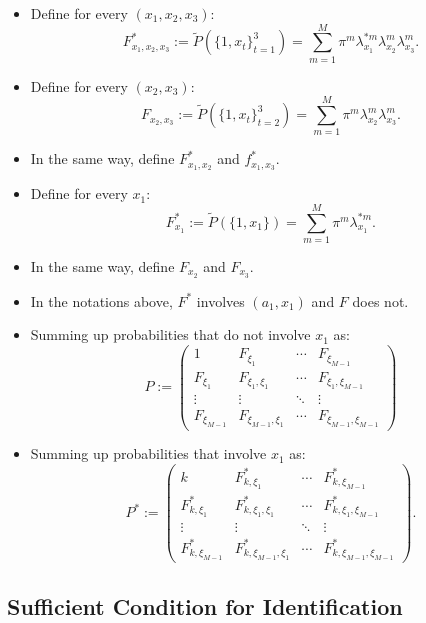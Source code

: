 \documentclass[
]{book}
\providecommand{\tightlist}{%
  \setlength{\itemsep}{0pt}\setlength{\parskip}{0pt}}
\begin{document}
\begin{itemize}
\tightlist
\item
  Define for every \((x_1, x_2, x_3)\):
  \[
  F_{x_1, x_2, x_3}^* := \widetilde{P}(\{1, x_t\}_{t = 1}^3) = \sum_{m = 1}^M \pi^m \lambda_{x_1}^{*m} \lambda_{x_2}^m \lambda_{x_3}^m.
  \]
\item
  Define for every \((x_2, x_3)\):
  \[
  F_{x_2, x_3} := \widetilde{P}(\{1, x_t\}_{t = 2}^3) = \sum_{m = 1}^M \pi^m \lambda_{x_2}^m \lambda_{x_3}^m.
  \]
\item
  In the same way, define \(F_{x_1, x_2}^*\) and \(f_{x_1, x_3}^*\).
\item
  Define for every \(x_1\):
  \[
  F_{x_1}^* := \widetilde{P}(\{1, x_1\}) = \sum_{m = 1}^M \pi^m \lambda_{x_1}^{*m}.
  \]
\item
  In the same way, define \(F_{x_2}\) and \(F_{x_3}\).
\item
  In the notations above, \(F^*\) involves \((a_1, x_1)\) and \(F\) does not.
\item
  Summing up probabilities that do not involve \(x_1\) as:
  \[
  P :=
  \begin{pmatrix}
  1 & F_{\xi_1} & \cdots & F_{\xi_{M - 1}}\\
  F_{\xi_1} & F_{\xi_1, \xi_1} & \cdots & F_{\xi_1, \xi_{M - 1}}\\
  \vdots & \vdots & \ddots & \vdots\\
  F_{\xi_{M - 1}} & F_{\xi_{M - 1}, \xi_1} & \cdots & F_{\xi_{M - 1}, \xi_{M - 1}}
  \end{pmatrix}
  \]
\item
  Summing up probabilities that involve \(x_1\) as:
  \[
  P^* :=
  \begin{pmatrix}
  k & F^*_{k, \xi_1} & \cdots & F^*_{k, \xi_{M - 1}}\\
  F^*_{k, \xi_1} & F^*_{k, \xi_1, \xi_1} & \cdots & F^*_{k, \xi_1, \xi_{M - 1}}\\
  \vdots & \vdots & \ddots & \vdots\\
  F^*_{k, \xi_{M - 1}} & F^*_{k, \xi_{M - 1}, \xi_1} & \cdots & F^*_{k, \xi_{M - 1}, \xi_{M - 1}}
  \end{pmatrix}.
  \]
\end{itemize}

\hypertarget{sufficient-condition-for-identification}{%
\subsection{Sufficient Condition for Identification}\label{sufficient-condition-for-identification}}
\end{document}
